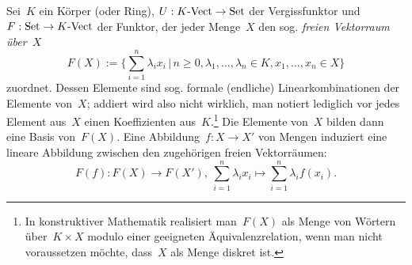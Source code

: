 Sei~$K$ ein Körper (oder Ring), $U : {K\text{-}\mathrm{Vect}} \to \mathrm{Set}$ der
Vergissfunktor und~$F : \mathrm{Set} \to {K\text{-}\mathrm{Vect}}$ der Funktor, der jeder Menge~$X$
den sog. \emph{freien Vektorraum über~$X$}
\[ F(X) := \Biggl\{ \sum_{i=1}^n \lambda_i x_i \,\Bigg|\,
  n \geq 0, \lambda_1, \ldots, \lambda_n \in K, x_1, \ldots, x_n \in X \Biggr\} \]
zuordnet. Dessen Elemente sind sog. formale (endliche) Linearkombinationen der
Elemente von~$X$; addiert wird also nicht wirklich, man notiert lediglich vor
jedes Element aus~$X$ einen Koeffizienten aus~$K$.\footnote{In konstruktiver
Mathematik realisiert man~$F(X)$ als Menge von Wörtern über~$K \times X$ modulo
einer geeigneten Äquivalenzrelation, wenn man nicht voraussetzen möchte,
dass~$X$ als Menge diskret ist.} Die Elemente von~$X$ bilden dann eine Basis
von~$F(X)$.
Eine Abbildung~$f : X \to X'$ von Mengen induziert eine lineare Abbildung
zwischen den zugehörigen freien Vektorräumen:
\[ F(f) : F(X) \to F(X'),\ \sum_{i=1}^n \lambda_i x_i \mapsto
  \sum_{i=1}^n \lambda_i f(x_i). \]

